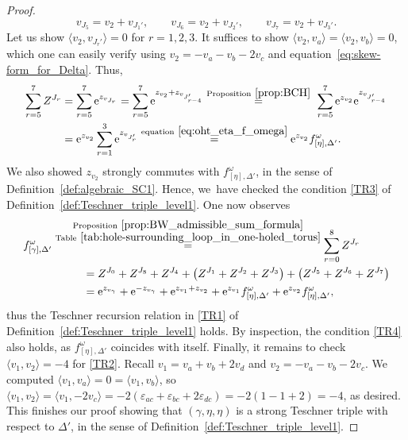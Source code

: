 \documentclass[pdftex]{sigma}
\numberwithin{equation}{section}
\theoremstyle{definition}
\begin{document}
\begin{proof}
\[
v_{J_5} = v_2 + v_{J_1'}, \qquad
v_{J_6} = v_2 + v_{J_2'}, \qquad
v_{J_7} = v_2 + v_{J_3'}.
\]
Let us show $\langle v_2, v_{J_r'} \rangle=0$ for $r=1,2,3$. It suffices to show $\langle v_2,v_a\rangle = \langle v_2,v_b \rangle=0$, which one can easily verify using $v_2 = -v_a-v_b-2v_c$ and equation~\eqref{eq:skew-form_for_Delta}. Thus,
\begin{align*}\begin{split}
\sum_{r=5}^{7} Z^{J_r} & = \sum_{r=5}^{7} {\rm e}^{z_{v_{J_r}}}
= \sum_{r=5}^{7} {\rm e}^{z_{v_2} + z_{v_{J_{r-4}'}}}
 \stackrel{{\rm Proposition}~\ref{prop:BCH}}{=}~
\sum_{r=5}^{7} {\rm e}^{z_{v_2}} {\rm e}^{z_{v_{J_{r-4}'}}} \\
 & = {\rm e}^{z_{v_2}} \sum_{r=1}^{3} {\rm e}^{z_{v_{J_r'}}}
 \stackrel{{\rm equation}~\eqref{eq:oht_eta_f_omega}}{=}
{\rm e}^{z_{v_2}} f^\omega_{[\eta],\Delta'}.
\end{split}
\end{align*}
We also showed $z_{v_2}$ strongly commutes with $f^\omega_{[\eta],\Delta'}$, in the sense of Definition~\ref{def:algebraic_SC1}. Hence, we~have checked the condition \ref{TR3} of Definition~\ref{def:Teschner_triple_level1}.
One now observes
\begin{align*}
& f^\omega_{[\gamma],\Delta'}
\stackrel{\substack{{\rm Proposition}~\ref{prop:BW_admissible_sum_formula} \\ {\rm Table}~\ref{tab:hole-surrounding_loop_in_one-holed_torus}}}{=}
\sum_{r=0}^{8} Z^{J_r} \\
& \hspace{19mm} = Z^{J_0} + Z^{J_8} + Z^{J_4} + \bigl(Z^{J_1}+Z^{J_2}+Z^{J_3}\bigr) + \bigl(Z^{J_5}+Z^{J_6}+Z^{J_7}\bigr) \\
& \hspace{19mm} = {\rm e}^{z_{v_\gamma}} + {\rm e}^{-z_{v_\gamma}} + {\rm e}^{z_{v_1} + z_{v_2}}
+ {\rm e}^{z_{v_1}} f^\omega_{[\eta],\Delta'} + {\rm e}^{z_{v_2}} f^\omega_{[\eta],\Delta'},
\end{align*}
thus the Teschner recursion relation in \ref{TR1} of Definition~\ref{def:Teschner_triple_level1} holds. By inspection, the condition \ref{TR4} also holds, as $f^\omega_{[\eta],\Delta'}$ coincides with itself.
Finally, it remains to check $\langle v_1,v_2\rangle=-4$ for \ref{TR2}. Recall $v_1 = v_a + v_b + 2v_d$ and $v_2 = -v_a-v_b-2v_c$. We computed $\langle v_1, v_a\rangle = 0 = \langle v_1, v_b\rangle$, so $\langle v_1,v_2 \rangle = \langle v_1, -2v_c\rangle = -2( \varepsilon_{ac} + \varepsilon_{bc} + 2\varepsilon_{dc}) = -2(1 - 1 + 2) = -4$, as desired.
This finishes our proof showing that $(\gamma,\eta,\eta)$ is a strong Teschner triple with respect to $\Delta'$, in the sense of Definition~\ref{def:Teschner_triple_level1}.
\end{proof}
\end{document}

